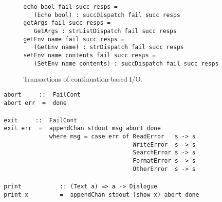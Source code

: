 \begin{figure}
{\mbox{\tt echo\ bool\ fail\ succ\ resps\ =}\\
\mbox{\tt \ \ \ (Echo\ bool)\ :\ succDispatch\ fail\ succ\ resps}\\
\mbox{\tt getArgs\ fail\ succ\ resps\ =}\\
\mbox{\tt \ \ \ GetArgs\ :\ strListDispatch\ fail\ succ\ resps}\\
\mbox{\tt getEnv\ name\ fail\ succ\ resps\ =}\\
\mbox{\tt \ \ \ (GetEnv\ name)\ :\ strDispatch\ fail\ succ\ resps}\\
\mbox{\tt setEnv\ name\ contents\ fail\ succ\ resps\ =}\\
\mbox{\tt \ \ \ (SetEnv\ name\ contents)\ :\ succDispatch\ fail\ succ\ resps}
}
\caption{Transactions of continuation-based I/O.}
\label{continuation-fig}
\end{figure}
\bprog
\mbox{\tt abort\ \ \ \ \ ::\ \ FailCont}\\
\mbox{\tt abort\ err\ \ =\ \ done}\\
\mbox{\tt }\\[-8pt]
\mbox{\tt exit\ \ \ \ \ ::\ \ FailCont}\\
\mbox{\tt exit\ err\ \ =\ \ appendChan\ stdout\ msg\ abort\ done}\\
\mbox{\tt \ \ \ \ \ \ \ \ \ \ \ \ \ where\ msg\ =\ case\ err\ of\ ReadError\ \ \ s\ ->\ s}\\
\mbox{\tt \ \ \ \ \ \ \ \ \ \ \ \ \ \ \ \ \ \ \ \ \ \ \ \ \ \ \ \ \ \ \ \ \ \ \ \ \ WriteError\ \ s\ ->\ s}\\
\mbox{\tt \ \ \ \ \ \ \ \ \ \ \ \ \ \ \ \ \ \ \ \ \ \ \ \ \ \ \ \ \ \ \ \ \ \ \ \ \ SearchError\ s\ ->\ s}\\
\mbox{\tt \ \ \ \ \ \ \ \ \ \ \ \ \ \ \ \ \ \ \ \ \ \ \ \ \ \ \ \ \ \ \ \ \ \ \ \ \ FormatError\ s\ ->\ s}\\
\mbox{\tt \ \ \ \ \ \ \ \ \ \ \ \ \ \ \ \ \ \ \ \ \ \ \ \ \ \ \ \ \ \ \ \ \ \ \ \ \ OtherError\ \ s\ ->\ s}\\
\mbox{\tt }\\[-8pt]
\mbox{\tt print\ \ \ \ \ \ \ \ \ \ \ ::\ (Text\ a)\ =>\ a\ ->\ Dialogue}\\
\mbox{\tt print\ x\ \ \ \ \ \ \ \ \ =\ \ appendChan\ stdout\ (show\ x)\ abort\ done}\\
